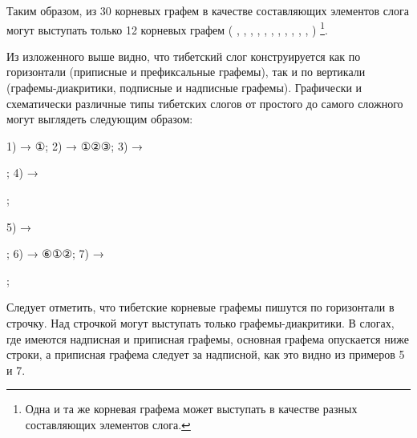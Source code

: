 Таким образом, из 30 корневых графем в качестве составляющих элементов слога могут выступать только 12 корневых графем ( , , , , , , , , , , ,  ) \footnote[10]{Одна и та же корневая графема может выступать в качестве разных составляющих элементов слога.}.

Из изложенного выше видно, что тибетский слог конструируется как по горизонтали (приписные и префиксальные графемы), так и по вертикали (графемы-диакритики, подписные и надписные графемы). Графически и схематически различные типы тибетских слогов от простого до самого сложного могут выглядеть следующим образом:

1)  {\unifont →} {\unifont ①}; 2)  {\unifont →} {\unifont ①②③};
3)  {\unifont →}
;
4)  {\unifont →}
;

5)  {\unifont →}
;
6)  {\unifont →} {\unifont ⑥①②};
7)  {\unifont →}
;

Следует отметить, что тибетские корневые графемы пишутся по горизонтали в строчку. Над строчкой могут выступать только графемы-диакритики. В слогах, где имеются надписная и приписная графемы, основная графема опускается ниже строки, а приписная графема следует за надписной, как это видно из примеров 5 и 7.

